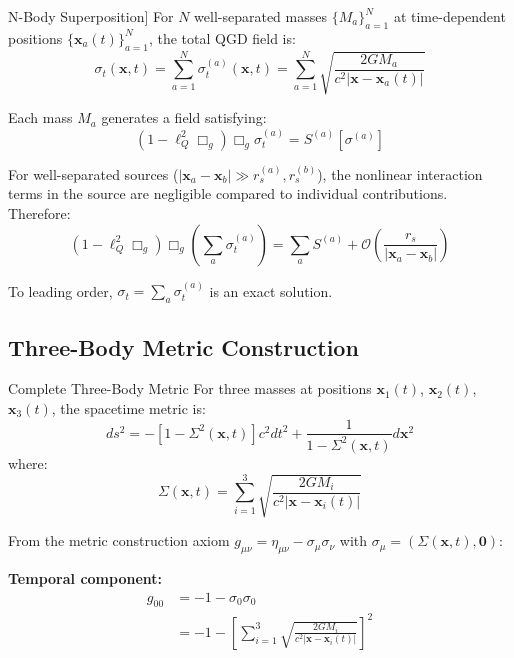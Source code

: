 \documentclass[11pt,a4paper]{article}
\theoremstyle{definition}
\theoremstyle{remark}
\begin{document}
	N-Body Superposition]\label{thm:nbody_superposition}
		For $N$ well-separated masses $\{M_a\}_{a=1}^N$ at time-dependent positions $\{\mathbf{x}_a(t)\}_{a=1}^N$, the total QGD field is:
		\begin{equation}\label{eq:field_superposition}
			\sigma_t(\mathbf{x}, t) = \sum_{a=1}^N \sigma_t^{(a)}(\mathbf{x}, t) = \sum_{a=1}^N \sqrt{\frac{2GM_a}{c^2|\mathbf{x}-\mathbf{x}_a(t)|}}
		\end{equation}
	
		Each mass $M_a$ generates a field satisfying:
		\[
		\left(1 - \ell_Q^2\Box_g\right)\Box_g\sigma_t^{(a)} = S^{(a)}[\sigma^{(a)}]
		\]
		
		For well-separated sources ($|\mathbf{x}_a - \mathbf{x}_b| \gg r_s^{(a)}, r_s^{(b)}$), the nonlinear interaction terms in the source are negligible compared to individual contributions. Therefore:
		\[
		\left(1 - \ell_Q^2\Box_g\right)\Box_g\left(\sum_a \sigma_t^{(a)}\right) = \sum_a S^{(a)} + \mathcal{O}\left(\frac{r_s}{|\mathbf{x}_a - \mathbf{x}_b|}\right)
		\]
		
		To leading order, $\sigma_t = \sum_a \sigma_t^{(a)}$ is an exact solution.
	
	\subsection{Three-Body Metric Construction}
	
	Complete Three-Body Metric\label{thm:threebody_metric}
		For three masses at positions $\mathbf{x}_1(t)$, $\mathbf{x}_2(t)$, $\mathbf{x}_3(t)$, the spacetime metric is:
		\begin{equation}\label{eq:metric_compact}
			ds^2 = -\left[1 - \Sigma^2(\mathbf{x}, t)\right]c^2dt^2 + \frac{1}{1-\Sigma^2(\mathbf{x}, t)}d\mathbf{x}^2
		\end{equation}
		where:
		\begin{equation}\label{eq:Sigma_def}
			\Sigma(\mathbf{x}, t) = \sum_{i=1}^3 \sqrt{\frac{2GM_i}{c^2|\mathbf{x}-\mathbf{x}_i(t)|}}
		\end{equation}
	
		From the metric construction axiom $g_{\mu\nu} = \eta_{\mu\nu} - \sigma_\mu\sigma_\nu$ with $\sigma_\mu = (\Sigma(\mathbf{x},t), \mathbf{0})$:
		
		\textbf{Temporal component:}
		\begin{align}
			g_{00} &= -1 - \sigma_0\sigma_0 \nonumber\\
			&= -1 - \left[\sum_{i=1}^3 \sqrt{\frac{2GM_i}{c^2|\mathbf{x}-\mathbf{x}_i(t)|}}\right]^2
		\end{align}
		
\end{document}
